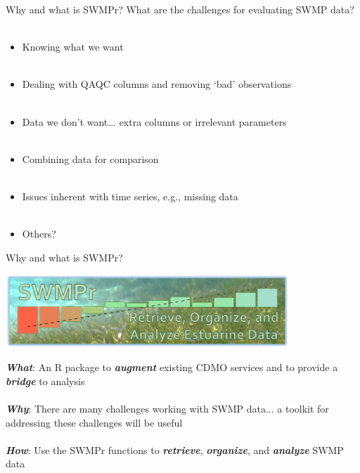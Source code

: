 \documentclass[xcolor=dvipsnames,serif]{beamer}\usepackage[]{graphicx}\usepackage[]{color}
\newcommand{\Bigtxt}[1]{\textbf{\textit{#1}}}
\begin{document}
\begin{frame}[t]{Why and what is SWMPr?}
\onslide<+->
What are the challenges for evaluating SWMP data? \\~\\
\onslide<+->
\begin{itemize}
\item Knowing what we want \\~\\
\item Dealing with QAQC columns and removing `bad' observations \\~\\
\item Data we don't want... extra columns or irrelevant parameters \\~\\
\item Combining data for comparison\\~\\
\item Issues inherent with time series, e.g., missing data \\~\\
\item Others?
\end{itemize}
\end{frame}

\begin{frame}{Why and what is SWMPr?}
\onslide<+->
\centerline{\includegraphics[width = 0.8\textwidth]{imgs/swmpr_logo.png}}
\vspace{0.2in}
\textbf{\emph{What}}: An R package to \Bigtxt{augment} existing CDMO services and to provide a \Bigtxt{bridge} to analysis\\~\\
\onslide<+->
\Bigtxt{Why}: There are many challenges working with SWMP data... a toolkit for addressing these challenges will be useful \\~\\
\onslide<+->
\Bigtxt{How}: Use the SWMPr functions to \Bigtxt{retrieve}, \Bigtxt{organize}, and \Bigtxt{analyze} SWMP data 
\end{frame}
\end{document}
